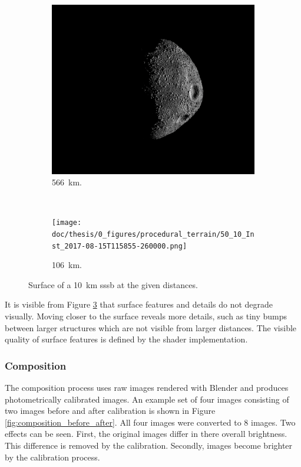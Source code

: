 \begin{figure}[htb]
    \centering
        \begin{subfigure}[b]{0.75\textwidth}
            \centering
                \includegraphics[width=\textwidth]{doc/thesis/0_figures/procedural_terrain/50_10_Inst_2017-08-15T115755-845000.png}
            \caption{\SI{566}{\kilo\meter}.}
            \label{fig:img_procedural_500}
        \end{subfigure}
        \\
        \begin{subfigure}[b]{0.75\textwidth}
            \centering
                \texttt{[image: doc/thesis/0\_figures/procedural\_terrain/50\_10\_Inst\_2017-08-15T115855-260000.png]}
            \caption{\SI{106}{\kilo\meter}.}
            \label{fig:img_procedural_100}
        \end{subfigure}
    \caption{Surface of a \SI{10}{\kilo\meter} \gls{sssb} at the given distances.}
    \label{fig:img_procedural_10k}
\end{figure}

It is visible from Figure \ref{fig:img_procedural_10k} that surface features and details do not degrade visually. Moving closer to the surface reveals more details, such as tiny bumps between larger structures which are not visible from larger distances. The visible quality of surface features is defined by the shader implementation. 

\subsubsection{Composition}
The composition process uses raw images rendered with Blender and produces photometrically calibrated images. An example set of four images consisting of two images before and after calibration is shown in Figure \ref{fig:composition_before_after}. All four images were converted to \SI{8}{\bit} images. Two effects can be seen. First, the original images differ in there overall brightness. This difference is removed by the calibration. Secondly, images become brighter by the calibration process. 

